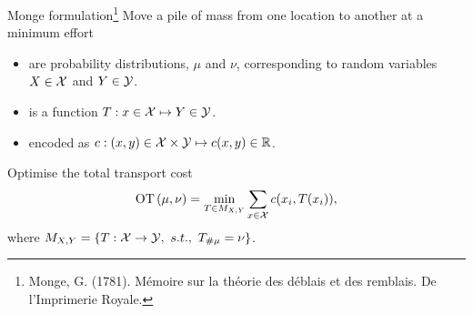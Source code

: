 \documentclass[pdf,aspectratio=169,10pt]{beamer}
\begin{document}
\begin{frame}[plain]{Monge formulation\footnote{Monge, G. (1781).
Mémoire sur la théorie des déblais et des remblais.
De l'Imprimerie Royale.}}
 Move a pile of mass from one location to another at a minimum effort\\
\vspace{1em}

\begin{minipage}[t]{0.69\textwidth}
   \begin{itemize}
       \item {} are probability distributions, $\mu$ and $\nu$, corresponding to random variables $X\in{\mathcal{X}}$ and $Y\in{\mathcal{Y}}$. 
       \item {} is a function $T: x \in {\mathcal{X}}\mapsto Y\in{\mathcal{Y}}$.
    \item {} encoded as $c: (x,y)\in{\mathcal{X}}\times{\mathcal{Y}}\mapsto c(x,y)\in{\mathbb{R}}$.
   \end{itemize}
\vspace{1em}

 Optimise the total transport cost
    \begin{equation}
        \operatorname{OT}{(\mu,\nu)} = \min_{T\in M_{X,Y}}\sum_{x\in{\mathcal{X}}} c(x_i, T(x_i)),
    \end{equation}
     where $M_{X,Y} = \{ T: {\mathcal{X}} \to {\mathcal{Y}},\ s.t.,\ T_{\#\mu}=\nu \}$.
\end{minipage}   
\hfill
\begin{minipage}[t]{0.3\textwidth}
\vspace{2em}
\end{minipage}   

\end{frame}
\end{document}
